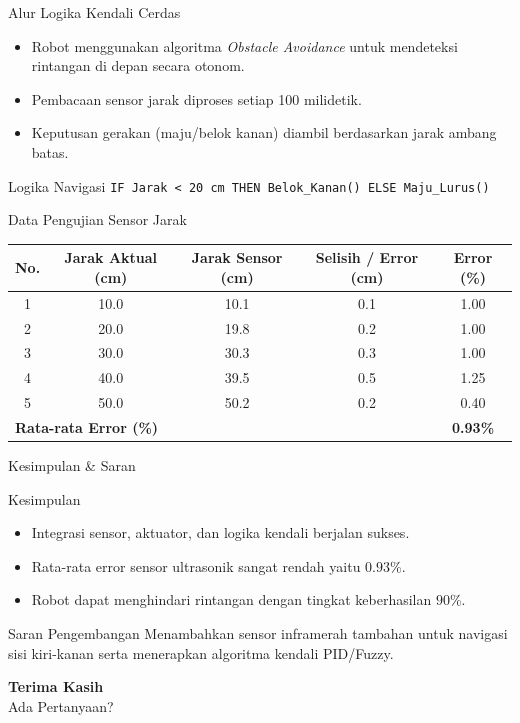 \documentclass[aspectratio=169]{beamer}
\begin{document}
\begin{frame}{Alur Logika Kendali Cerdas}
    \begin{itemize}
        \item Robot menggunakan algoritma \textit{Obstacle Avoidance} untuk mendeteksi rintangan di depan secara otonom.
        \item Pembacaan sensor jarak diproses setiap 100 milidetik.
        \item Keputusan gerakan (maju/belok kanan) diambil berdasarkan jarak ambang batas.
    \end{itemize}
    \begin{block}{Logika Navigasi}
        \texttt{IF Jarak < 20 cm THEN Belok\_Kanan() ELSE Maju\_Lurus()}
    \end{block}
\end{frame}

\begin{frame}{Data Pengujian Sensor Jarak}
    \centering
    \small
    \begin{tabular}{ccccc}
        \toprule
        \textbf{No.} & \textbf{Jarak Aktual (cm)} & \textbf{Jarak Sensor (cm)} & \textbf{Selisih / Error (cm)} & \textbf{Error (\%)} \\
        \midrule
        1  & 10.0 & 10.1 & 0.1 & 1.00 \\
        2  & 20.0 & 19.8 & 0.2 & 1.00 \\
        3  & 30.0 & 30.3 & 0.3 & 1.00 \\
        4  & 40.0 & 39.5 & 0.5 & 1.25 \\
        5  & 50.0 & 50.2 & 0.2 & 0.40 \\
        \midrule
        \multicolumn{4}{l}{\textbf{Rata-rata Error (\%)}} & \textbf{0.93\%} \\
        \bottomrule
    \end{tabular}
\end{frame}

\begin{frame}{Kesimpulan \& Saran}
    \begin{block}{Kesimpulan}
        \begin{itemize}
            \item Integrasi sensor, aktuator, dan logika kendali berjalan sukses.
            \item Rata-rata error sensor ultrasonik sangat rendah yaitu $0.93\%$.
            \item Robot dapat menghindari rintangan dengan tingkat keberhasilan $90\%$.
        \end{itemize}
    \end{block}
    
    \begin{block}{Saran Pengembangan}
        Menambahkan sensor inframerah tambahan untuk navigasi sisi kiri-kanan serta menerapkan algoritma kendali PID/Fuzzy.
    \end{block}
\end{frame}

\begin{frame}
    \centering
    \Huge \textbf{Terima Kasih}\\[0.5cm]
    \large Ada Pertanyaan?
\end{frame}
\end{document}
